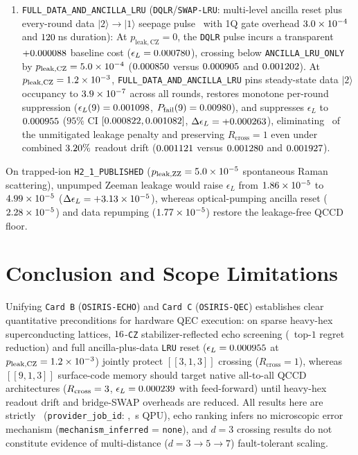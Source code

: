 \documentclass[aps,prx,twocolumn,superscriptaddress,nofootinbib]{revtex4-2}
\begin{document}
\begin{enumerate}
  \item \texttt{FULL\_DATA\_AND\_ANCILLA\_LRU} (\texttt{DQLR}/\texttt{SWAP-LRU}: multi-level ancilla reset plus every-round data $|2\rangle \to |1\rangle$ seepage pulse~\cite{MiaoLeakage2023,MarquesLRU2023} with 1Q gate overhead $3.0 \times 10^{-4}$ and $120$\,ns duration): At $p_{\mathrm{leak,CZ}} = 0$, the \texttt{DQLR} pulse incurs a transparent $+0.000088$ baseline cost ($\epsilon_L = 0.000780$), crossing below \texttt{ANCILLA\_LRU\_ONLY} by $p_{\mathrm{leak,CZ}} = 5.0 \times 10^{-4}$ ($0.000850$ versus $0.000905$ and $0.001202$). At $p_{\mathrm{leak,CZ}} = 1.2 \times 10^{-3}$, \texttt{FULL\_DATA\_AND\_ANCILLA\_LRU} pins steady-state data $|2\rangle$ occupancy to $3.9 \times 10^{-7}$ across all rounds, restores monotone per-round suppression ($\epsilon_L(9) = 0.001098$, $P_{\mathrm{fail}}(9) = 0.00980$), and suppresses $\epsilon_L$ to $0.000955$ ($95\%$ CI $[0.000822, 0.001082]$, $\Delta\epsilon_L = +0.000263$), eliminating \ecqLruPenaltyMitPct\ of the unmitigated leakage penalty and preserving $R_{\mathrm{cross}} = 1$ even under combined $3.20\%$ readout drift ($0.001121$ versus $0.001280$ and $0.001927$).
\end{enumerate}
On trapped-ion \texttt{H2\_1\_PUBLISHED} ($p_{\mathrm{leak,ZZ}} = 5.0 \times 10^{-5}$ spontaneous Raman scattering), unpumped Zeeman leakage would raise $\epsilon_L$ from $1.86 \times 10^{-5}$ to $4.99 \times 10^{-5}$ ($\Delta\epsilon_L = +3.13 \times 10^{-5}$), whereas optical-pumping ancilla reset ($2.28 \times 10^{-5}$) and data repumping ($1.77 \times 10^{-5}$) restore the leakage-free QCCD floor.

\section{Conclusion and Scope Limitations}
Unifying \texttt{Card B} (\texttt{OSIRIS-ECHO}) and \texttt{Card C} (\texttt{OSIRIS-QEC}) establishes clear quantitative preconditions for hardware QEC execution: on sparse heavy-hex superconducting lattices, $16$-\texttt{CZ} stabilizer-reflected echo screening (\ecqRegretRatioX\ top-$1$ regret reduction) and full ancilla-plus-data \texttt{LRU} reset ($\epsilon_L = 0.000955$ at $p_{\mathrm{leak,CZ}} = 1.2 \times 10^{-3}$) jointly protect $[[3,1,3]]$ crossing ($R_{\mathrm{cross}} = 1$), whereas $[[9,1,3]]$ surface-code memory should target native all-to-all QCCD architectures ($R_{\mathrm{cross}} = 3$, $\epsilon_L = 0.000239$ with feed-forward) until heavy-hex readout drift and bridge-SWAP overheads are reduced. All results here are strictly \ecqExecTier\ (\texttt{provider\_job\_id}: \ecqJobId, \ecqQpuSec\,s QPU), echo ranking infers no microscopic error mechanism (\texttt{mechanism\_inferred} = \texttt{none}), and $d = 3$ crossing results do not constitute evidence of multi-distance ($d = 3 \to 5 \to 7$) fault-tolerant scaling.
\end{document}
